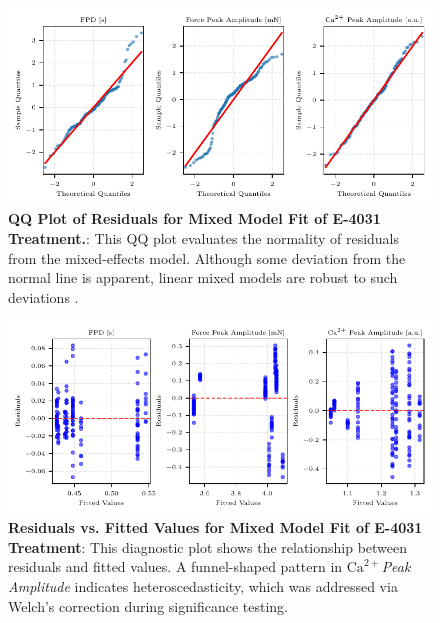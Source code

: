 \documentclass{report}
\begin{document}
            \begin{figure}[h]
                \centering
                \includegraphics[width=1.0\textwidth, keepaspectratio]{plots/chapter_5/e4031/qq_mixed_subset_3.pdf}
                \caption[QQ Plot of Residuals for Mixed Model Fit of E-4031 Treatment.]{\textbf{QQ Plot of Residuals for Mixed Model Fit of E-4031 Treatment.}: This QQ plot evaluates the normality of residuals from the mixed-effects model. Although some deviation from the normal line is apparent, linear mixed models are robust to such deviations  \cite{jacqmingadda:inserm-00084214}.}
                \label{fig:qq_subset_e4031}
            \end{figure}
        
            \begin{figure}[H]
                \centering
                \includegraphics[width=1\textwidth, keepaspectratio]{plots/chapter_5/e4031/resid_mixed_subset_3.pdf}
                \caption[Residuals vs. Fitted Values for Mixed Model Fit of E-4031 Treatment]{\textbf{Residuals vs. Fitted Values for Mixed Model Fit of E-4031 Treatment}: This diagnostic plot shows the relationship between residuals and fitted values. A funnel-shaped pattern in \textit{\(\text{Ca}^{2+}\)Peak Amplitude} indicates heteroscedasticity, which was addressed via Welch's correction during significance testing.}
                \label{fig:fit_v_residual_subset_e4031}
            \end{figure}
\end{document}
